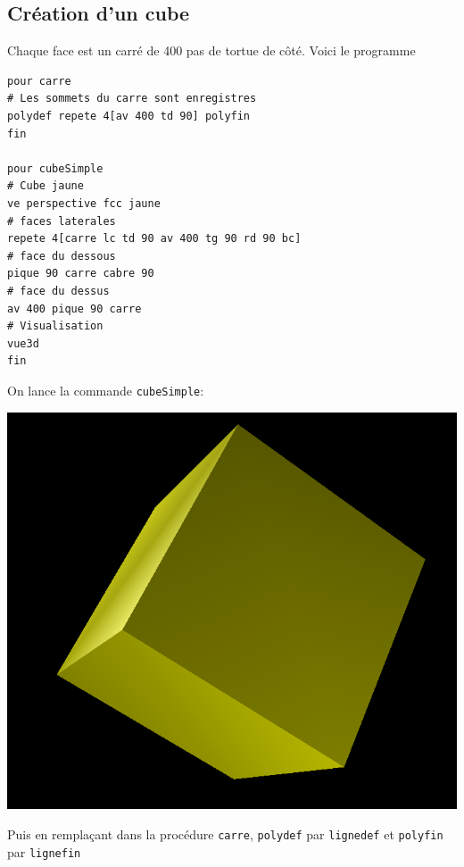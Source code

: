 \subsection{Création d'un cube}
\noindent Chaque face est un carré de 400 pas de tortue de côté. Voici le programme
\begin{verbatim}
pour carre
# Les sommets du carre sont enregistres
polydef repete 4[av 400 td 90] polyfin
fin

pour cubeSimple
# Cube jaune
ve perspective fcc jaune
# faces laterales
repete 4[carre lc td 90 av 400 tg 90 rd 90 bc]
# face du dessous 
pique 90 carre cabre 90
# face du dessus
av 400 pique 90 carre
# Visualisation
vue3d
fin
\end{verbatim}
On lance la commande \texttt{cubeSimple}:
\begin{center}
\includegraphics*[scale=0.4]{images/3dCube1.png}
\end{center}
Puis en remplaçant dans la procédure \texttt{carre}, \texttt{polydef} par \texttt{lignedef} et \texttt{polyfin} par \texttt{lignefin}
